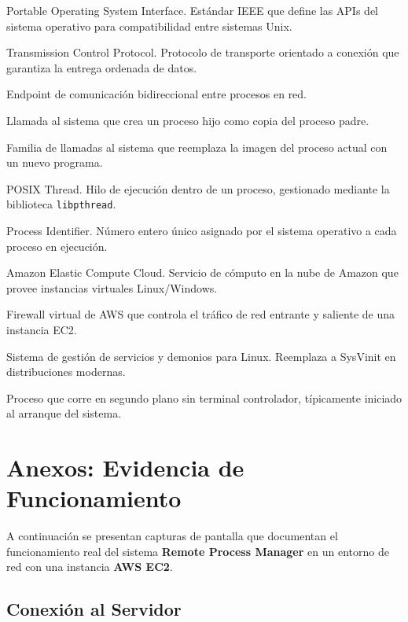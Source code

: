 \documentclass[12pt,a4paper]{report}
\begin{document}
\begin{description}[leftmargin=3cm, labelwidth=2.8cm]
  \item[\textbf{POSIX}] Portable Operating System Interface. Estándar IEEE que define las APIs del sistema operativo para compatibilidad entre sistemas Unix.
  \item[\textbf{TCP}] Transmission Control Protocol. Protocolo de transporte orientado a conexión que garantiza la entrega ordenada de datos.
  \item[\textbf{Socket}] Endpoint de comunicación bidireccional entre procesos en red.
  \item[\textbf{fork()}] Llamada al sistema que crea un proceso hijo como copia del proceso padre.
  \item[\textbf{exec()}] Familia de llamadas al sistema que reemplaza la imagen del proceso actual con un nuevo programa.
  \item[\textbf{pthread}] POSIX Thread. Hilo de ejecución dentro de un proceso, gestionado mediante la biblioteca \texttt{libpthread}.
  \item[\textbf{PID}] Process Identifier. Número entero único asignado por el sistema operativo a cada proceso en ejecución.
  \item[\textbf{AWS EC2}] Amazon Elastic Compute Cloud. Servicio de cómputo en la nube de Amazon que provee instancias virtuales Linux/Windows.
  \item[\textbf{Security Group}] Firewall virtual de AWS que controla el tráfico de red entrante y saliente de una instancia EC2.
  \item[\textbf{Systemd}] Sistema de gestión de servicios y demonios para Linux. Reemplaza a SysVinit en distribuciones modernas.
  \item[\textbf{Daemon/Demonio}] Proceso que corre en segundo plano sin terminal controlador, típicamente iniciado al arranque del sistema.
\end{description}

\chapter{Anexos: Evidencia de Funcionamiento}

A continuación se presentan capturas de pantalla que documentan el funcionamiento real del sistema \textbf{Remote Process Manager} en un entorno de red con una instancia \textbf{AWS EC2}.

\section{Conexión al Servidor}
\end{document}
